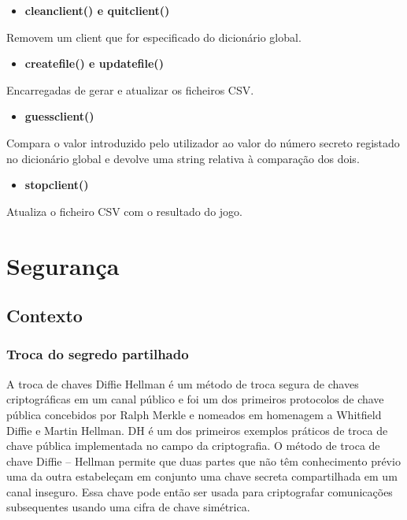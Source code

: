 \documentclass{report}
\begin{document}
\begin{itemize}
	\item \textbf {clean\textunderscore client() e quit\textunderscore client()}
\end{itemize}
Removem um client que for especificado do dicionário global.

\begin{itemize}
	\item \textbf {create\textunderscore file() e update\textunderscore file()}
\end{itemize}
Encarregadas de gerar e atualizar os ficheiros CSV.


\begin{itemize}
	\item \textbf {guess\textunderscore client()}
\end{itemize}
Compara o valor introduzido pelo utilizador ao valor do número secreto registado no dicionário global e devolve uma string relativa à comparação dos dois.

\begin{itemize}
	\item \textbf {stop\textunderscore client()}
\end{itemize}
Atualiza o ficheiro CSV com o resultado do jogo.



\section{Segurança}
\subsection{Contexto}


\subsubsection{Troca do segredo partilhado}
A troca de chaves Diffie Hellman é um método de troca segura de chaves criptográficas em um canal público e foi um dos primeiros protocolos de chave pública concebidos por Ralph Merkle e nomeados em homenagem a Whitfield Diffie e Martin Hellman. DH é um dos primeiros exemplos práticos de troca de chave pública implementada no campo da criptografia. \newline
O método de troca de chave Diffie – Hellman permite que duas partes que não têm conhecimento prévio uma da outra estabeleçam em conjunto uma chave secreta compartilhada em um canal inseguro. Essa chave pode então ser usada para criptografar comunicações subsequentes usando uma cifra de chave simétrica.
\end{document}
